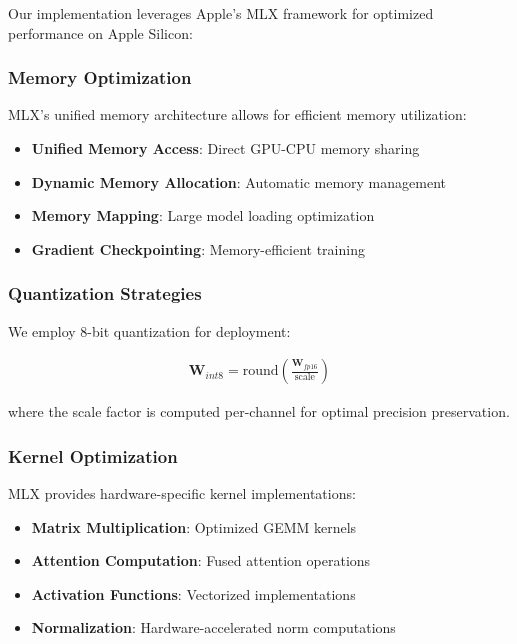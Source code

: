 Our implementation leverages Apple's MLX framework for optimized performance on Apple Silicon:

\subsubsection{Memory Optimization}

MLX's unified memory architecture allows for efficient memory utilization:

\begin{itemize}
    \item \textbf{Unified Memory Access}: Direct GPU-CPU memory sharing
    \item \textbf{Dynamic Memory Allocation}: Automatic memory management
    \item \textbf{Memory Mapping}: Large model loading optimization
    \item \textbf{Gradient Checkpointing}: Memory-efficient training
\end{itemize}

\subsubsection{Quantization Strategies}

We employ 8-bit quantization for deployment:

\begin{align}
\mathbf{W}_{int8} = \text{round}\left(\frac{\mathbf{W}_{fp16}}{\text{scale}}\right)
\end{align}

where the scale factor is computed per-channel for optimal precision preservation.

\subsubsection{Kernel Optimization}

MLX provides hardware-specific kernel implementations:

\begin{itemize}
    \item \textbf{Matrix Multiplication}: Optimized GEMM kernels
    \item \textbf{Attention Computation}: Fused attention operations
    \item \textbf{Activation Functions}: Vectorized implementations
    \item \textbf{Normalization}: Hardware-accelerated norm computations
\end{itemize}


